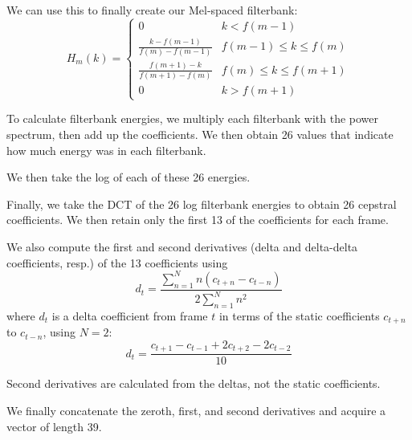 \documentclass{article}
\begin{document}
We can use this to finally create our Mel-spaced filterbank:
\begin{equation}
H_m(k) = \begin{cases}
0 & k<f(m-1)\\
\frac{k-f(m-1)}{f(m)-f(m-1)} & f(m-1)\leq k \leq f(m) \\
\frac{f(m+1) - k}{f(m+1)-f(m)} & f(m) \leq k \leq f(m+1)\\
0 & k > f(m+1)
\end{cases}
\end{equation}


To calculate filterbank energies, we multiply each filterbank with the power spectrum, then add up the coefficients. We then obtain 26 values that indicate how much energy was in each filterbank.

We then take the log of each of these 26 energies.

Finally, we take the DCT of the 26 log filterbank energies to obtain 26 cepstral coefficients. We then retain only the first 13 of the coefficients for each frame.

We also compute the first and second derivatives (delta and delta-delta coefficients, resp.) of the 13 coefficients using
\begin{equation}
d_t = \frac{\sum^N_{n=1}n\left(c_{t+n}-c_{t-n}\right)}{2\sum_{n=1}^Nn^2}
\end{equation}
where $d_t$ is a delta coefficient from frame $t$ in terms of the static coefficients $c_{t+n}$ to $c_{t-n}$, using $N=2$:
\begin{equation}
d_t = \frac{c_{t+1}-c_{t-1}+2c_{t+2}-2c_{t-2}}{10}
\end{equation}

Second derivatives are calculated from the deltas, not the static coefficients.

We finally concatenate the zeroth, first, and second derivatives and acquire a vector of length 39.
\end{document}

